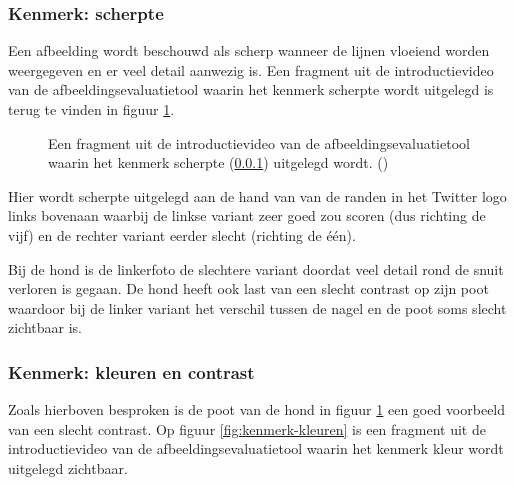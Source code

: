 \subsubsection{Kenmerk: scherpte}
\label{sec:onderzoek-evaluatietool-verloop-beoordeling-scherpte}

Een afbeelding wordt beschouwd als scherp wanneer de lijnen vloeiend worden weergegeven en er veel detail aanwezig is. Een fragment uit de introductievideo van de \gls{afbeeldingsevaluatietool} waarin het kenmerk scherpte wordt uitgelegd is terug te vinden in figuur \ref{fig:kenmerk-scherpte}.

\begin{figure}[]
	\centering
	\caption{Een fragment uit de introductievideo van de \gls{afbeeldingsevaluatietool} waarin het kenmerk scherpte (\ref{sec:onderzoek-evaluatietool-verloop-beoordeling-scherpte}) uitgelegd wordt. (\cite{introductievideo})}
	\label{fig:kenmerk-scherpte}
\end{figure}

Hier wordt scherpte uitgelegd aan de hand van van de randen in het Twitter logo links bovenaan waarbij de linkse variant zeer goed zou scoren (dus richting de vijf) en de rechter variant eerder slecht (richting de één).

Bij de hond is de linkerfoto de slechtere variant doordat veel detail rond de snuit verloren is gegaan. De hond heeft ook last van een slecht contrast op zijn poot waardoor bij de linker variant het verschil tussen de nagel en de poot soms slecht zichtbaar is.

\subsubsection{Kenmerk: kleuren en contrast}
\label{sec:onderzoek-evaluatietool-verloop-beoordeling-kleur}

Zoals hierboven besproken is de poot van de hond in figuur \ref{fig:kenmerk-scherpte} een goed voorbeeld van een slecht contrast. Op figuur \ref{fig:kenmerk-kleuren} is een fragment uit de introductievideo van de \gls{afbeeldingsevaluatietool} waarin het kenmerk kleur wordt uitgelegd zichtbaar. 

